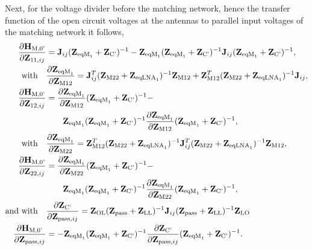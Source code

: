 Next, for the voltage divider before the matching network, hence the transfer function of the open circuit voltages at the antennas to parallel input voltages of the matching network it follows,
\begin{align}
\label{eq:HM0_sig_grad}
\frac{\partial\mathbf{H}_\text{M,0'}}{\partial\mathbf{Z}_{11,ij}}&=
	\mathbf{J}_{ij}(\mathbf{Z}_{\text{eqM}_1} + \mathbf{Z}_\text{C'})^{-1} - 
	\mathbf{Z}_{\text{eqM}_1}(\mathbf{Z}_{\text{eqM}_1} + 
	\mathbf{Z}_\text{C'})^{-1}\mathbf{J}_{ij}(\mathbf{Z}_{\text{eqM}_1} + 
	\mathbf{Z}_\text{C'})^{-1},\\\nonumber
\text{with}\quad&\frac{\partial\mathbf{Z}_{\text{eqM}_1}}{\partial\mathbf{Z}_\text{M12}} = 
	\mathbf{J}_{ij}^T(\mathbf{Z}_\text{M22} + \mathbf{Z}_{\text{eqLNA}_1})^{-1}\mathbf{Z}_\text{M12} + 
	\mathbf{Z}_\text{M12}^T(\mathbf{Z}_\text{M22} + 
	\mathbf{Z}_{\text{eqLNA}_1})^{-1}\mathbf{J}_{ij}, \\\nonumber
\frac{\partial\mathbf{H}_\text{M,0'}}{\partial\mathbf{Z}_{12,ij}}&=
	\frac{\partial\mathbf{Z}_{\text{eqM}_1}}{\partial\mathbf{Z}_\text{M12}}
	(\mathbf{Z}_{\text{eqM}_1} + \mathbf{Z}_\text{C'})^{-1} -\\
&\qquad	\mathbf{Z}_{\text{eqM}_1}(\mathbf{Z}_{\text{eqM}_1} + \mathbf{Z}_\text{C'})^{-1}
	\frac{\partial\mathbf{Z}_{\text{eqM}_1}}{\partial\mathbf{Z}_\text{M12}}
	(\mathbf{Z}_{\text{eqM}_1} + \mathbf{Z}_\text{C'})^{-1},\\\nonumber
\text{with}\quad&\frac{\partial\mathbf{Z}_{\text{eqM}_1}}{\partial\mathbf{Z}_\text{M22}} = 
	\mathbf{Z}_\text{M12}^T(\mathbf{Z}_\text{M22} + \mathbf{Z}_{\text{eqLNA}_1})^{-1}
	\mathbf{J}_{ij}^T(\mathbf{Z}_\text{M22} +
	\mathbf{Z}_{\text{eqLNA}_1})^{-1}\mathbf{Z}_\text{M12},\\\nonumber
\frac{\partial\mathbf{H}_\text{M,0'}}{\partial\mathbf{Z}_{22,ij}}&=
	\frac{\partial\mathbf{Z}_{\text{eqM}_1}}{\partial\mathbf{Z}_\text{M22}}
	(\mathbf{Z}_{\text{eqM}_1} + \mathbf{Z}_\text{C'})^{-1} -\\
  &\qquad \mathbf{Z}_{\text{eqM}_1}(\mathbf{Z}_{\text{eqM}_1} + \mathbf{Z}_\text{C'})^{-1}
	\frac{\partial\mathbf{Z}_{\text{eqM}_1}}{\partial\mathbf{Z}_\text{M22}}
	(\mathbf{Z}_{\text{eqM}_1} + \mathbf{Z}_\text{C'})^{-1},\\\nonumber
\text{and with}\quad&\frac{\partial\mathbf{Z}_\text{C'}}{\partial\mathbf{Z}_{\text{pass},ij}} = 
	\mathbf{Z}_\text{OL}(\mathbf{Z}_{\text{pass}}+
	\mathbf{Z}_\text{LL})^{-1}\mathbf{J}_{ij}(\mathbf{Z}_{\text{pass}}+
	\mathbf{Z}_\text{LL})^{-1}\mathbf{Z}_\text{LO}\\
\frac{\partial\mathbf{H}_\text{M,0'}}{\partial\mathbf{Z}_{\text{pass},ij}}&=
	-\mathbf{Z}_{\text{eqM}_1}(\mathbf{Z}_{\text{eqM}_1} + \mathbf{Z}_\text{C'})^{-1}
	\frac{\partial\mathbf{Z}_\text{C'}}{\partial\mathbf{Z}_{\text{pass},ij}}
	(\mathbf{Z}_{\text{eqM}_1} + \mathbf{Z}_\text{C'})^{-1}.
\end{align}




